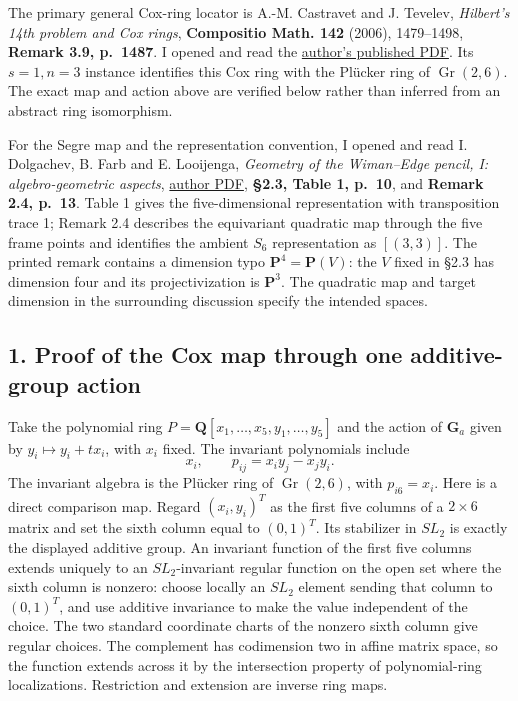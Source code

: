 \documentclass[
  10pt,
]{article}
\begin{document}
The primary general Cox-ring locator is A.-M. Castravet and J. Tevelev,
\emph{Hilbert's 14th problem and Cox rings}, \textbf{Compositio Math.
142} (2006), 1479--1498, \textbf{Remark 3.9, p.~1487}. I opened and read
the \href{https://people.math.umass.edu/~tevelev/14problem.pdf}{author's
published PDF}. Its \(s=1,n=3\) instance identifies this Cox ring with
the Plücker ring of \(\operatorname{Gr}(2,6)\). The exact map and action
above are verified below rather than inferred from an abstract ring
isomorphism.

For the Segre map and the representation convention, I opened and read
I. Dolgachev, B. Farb and E. Looijenga, \emph{Geometry of the
Wiman--Edge pencil, I: algebro-geometric aspects},
\href{https://www.math.uchicago.edu/~farb/papers/wiman.pdf}{author PDF},
\textbf{§2.3, Table 1, p.~10}, and \textbf{Remark 2.4, p.~13}. Table 1
gives the five-dimensional representation with transposition trace 1;
Remark 2.4 describes the equivariant quadratic map through the five
frame points and identifies the ambient \(S_6\) representation as
\([(3,3)]\). The printed remark contains a dimension typo
\(\mathbf P^4=\mathbf P(V)\): the \(V\) fixed in §2.3 has dimension four
and its projectivization is \(\mathbf P^3\). The quadratic map and
target dimension in the surrounding discussion specify the intended
spaces.

\subsection{1. Proof of the Cox map through one additive-group
action}\label{proof-of-the-cox-map-through-one-additive-group-action}

Take the polynomial ring \(P=\mathbf Q[x_1,\ldots,x_5,y_1,\ldots,y_5]\)
and the action of \(\mathbf G_a\) given by \(y_i\mapsto y_i+t x_i\),
with \(x_i\) fixed. The invariant polynomials include \[
x_i,\qquad p_{ij}=x_i y_j-x_jy_i.
\] The invariant algebra is the Plücker ring of
\(\operatorname{Gr}(2,6)\), with \(p_{i6}=x_i\). Here is a direct
comparison map. Regard \((x_i,y_i)^T\) as the first five columns of a
\(2\times6\) matrix and set the sixth column equal to \((0,1)^T\). Its
stabilizer in \(SL_2\) is exactly the displayed additive group. An
invariant function of the first five columns extends uniquely to an
\(SL_2\)-invariant regular function on the open set where the sixth
column is nonzero: choose locally an \(SL_2\) element sending that
column to \((0,1)^T\), and use additive invariance to make the value
independent of the choice. The two standard coordinate charts of the
nonzero sixth column give regular choices. The complement has
codimension two in affine matrix space, so the function extends across
it by the intersection property of polynomial-ring localizations.
Restriction and extension are inverse ring maps.
\end{document}
